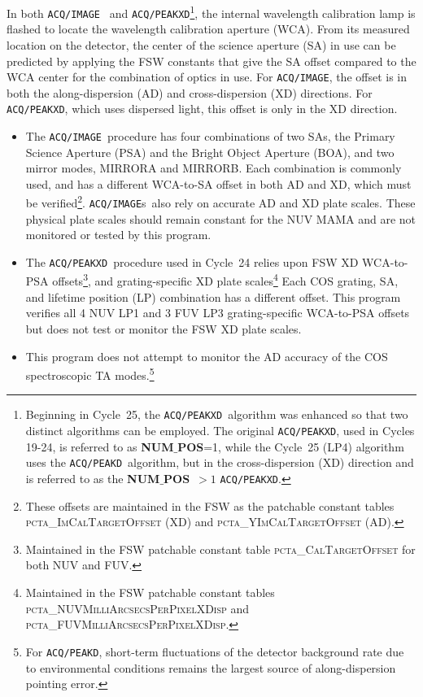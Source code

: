 \documentclass{stsci_report}
\newcommand{\tacq}[1]{\texttt{ACQ/#1}}
\begin{document}
In both \tacq{IMAGE}~ and \tacq{PEAKXD}\footnote{Beginning in Cycle~25, the \tacq{PEAKXD}~algorithm was enhanced so that two distinct algorithms can be employed.
The original \tacq{PEAKXD}, used in Cycles 19-24, is referred to as {{\bf NUM$\_$POS}\rm}=1, while the Cycle~25 (LP4) algorithm
uses the \tacq{PEAKD}~algorithm, but in the cross-dispersion (XD) direction and is referred to as the {{\bf NUM$\_$POS}\rm}~$>1$ \tacq{PEAKXD}.},
 the internal wavelength calibration lamp is flashed to locate the wavelength calibration aperture (WCA). From its measured location on the detector, the center of the science aperture (SA) in use can be predicted by applying the FSW constants that give the SA offset compared to the WCA center for the combination of optics in use.
For \tacq{IMAGE}, the offset is in both the along-dispersion (AD) and cross-dispersion (XD) directions. For \tacq{PEAKXD}, which uses dispersed light, this offset is only in the XD direction.
\begin{itemize}
\item{The \tacq{IMAGE}~procedure has four combinations of two SAs, the Primary Science Aperture (PSA) and the Bright Object Aperture (BOA), and two mirror modes, MIRRORA and MIRRORB. Each combination is commonly used, and has a different WCA-to-SA offset in both AD and XD, which must be verified\footnote{These offsets are maintained in the FSW as the patchable constant tables \textsc{pcta\_ImCalTargetOffset} (XD) and \textsc\textsc{pcta\_YImCalTargetOffset} (AD).}. \tacq{IMAGE}s~also rely on accurate AD and XD plate scales. These physical plate scales should remain constant for the NUV MAMA and are not monitored or tested by this program.
}
\item{The \tacq{PEAKXD}~procedure used in Cycle~24 relies upon FSW XD WCA-to-PSA offsets\footnote{Maintained in the FSW patchable constant table \textsc{pcta\_CalTargetOffset} for both NUV and FUV.}, and grating-specific XD plate scales\footnote{Maintained in the FSW patchable constant tables \textsc{pcta\_NUVMilliArcsecsPerPixelXDisp} and \textsc{pcta\_FUVMilliArcsecsPerPixelXDisp}.}
Each COS grating, SA, and lifetime position (LP) combination has a different offset. This program verifies all 4 NUV LP1 and 3 FUV LP3 grating-specific WCA-to-PSA offsets but does not test or monitor the FSW XD plate scales.
}
\item{This program does not attempt to monitor the AD accuracy of the COS spectroscopic TA modes.\footnote{For \tacq{PEAKD}, short-term fluctuations of the detector background rate due to environmental conditions remains the largest source of along-dispersion pointing error.}
}
\end{itemize}
\end{document}
